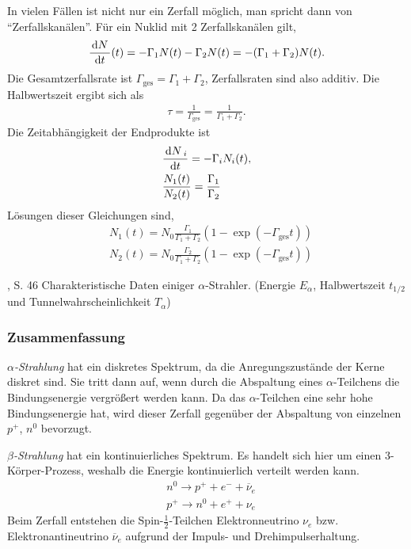 In vielen Fällen ist nicht nur ein Zerfall möglich, man spricht dann von
``Zerfallskanälen''. Für ein Nuklid mit 2 Zerfallskanälen gilt,
\begin{align*}
\frac{\,\mathrm{d} N\,}{\,\mathrm{d} t\,}(t) = -\Gamma_1 N(t) - \Gamma_2 N(t) = -(\Gamma_1+\Gamma_2)N(t).
\end{align*}
Die Gesamtzerfallsrate ist $\Gamma_\text{ges} = \Gamma_1+\Gamma_2$,
Zerfallsraten sind also additiv. Die Halbwertszeit ergibt sich als
\begin{align*}
\tau = \frac{1}{\Gamma_\text{ges}} = \frac{1}{\Gamma_1+\Gamma_2}.
\end{align*}
Die Zeitabhängigkeit der Endprodukte ist
\begin{align*}
&\frac{\,\mathrm{d} N\,_i}{\,\mathrm{d} t\,} = -\Gamma_i N_i(t),\\
&\frac{N_1(t)}{N_2(t)} = \frac{\Gamma_1}{\Gamma_2}
\end{align*}
Lösungen dieser Gleichungen sind,
\begin{align*}
&N_1(t) = N_0 \frac{\Gamma_1}{\Gamma_1+\Gamma_2}\left(1 -
\exp\left(-\Gamma_\text{ges} t \right)\right)\\
&N_2(t) = N_0 \frac{\Gamma_2}{\Gamma_1+\Gamma_2}\left(1 -
\exp\left(-\Gamma_\text{ges} t \right)\right)
\end{align*}

% 

	{\DemtroederFour, S. 46}
	{Charakteristische Daten einiger $\alpha$-Strahler. (Energie $E_\alpha$,
	Halbwertszeit $t_{1/2}$ und Tunnelwahrscheinlichkeit $T_\alpha$)}

\subsubsection{Zusammenfassung}

\textit{$\alpha$-Strahlung} hat ein diskretes Spektrum, da die Anregungszustände
der Kerne diskret sind. Sie tritt dann auf, wenn durch die Abspaltung eines
$\alpha$-Teilchens die Bindungsenergie vergrößert werden kann. Da das
$\alpha$-Teilchen eine sehr hohe Bindungsenergie hat, wird dieser Zerfall
gegenüber der Abspaltung von einzelnen $p^+$, $n^0$ bevorzugt.

\textit{$\beta$-Strahlung} hat ein kontinuierliches Spektrum. Es handelt sich
hier um einen 3-Körper-Prozess, weshalb die Energie kontinuierlich verteilt
werden kann.
\begin{align*}
&n^0 \to p^+ + e^- + \overline{\nu}_e\\
&p^+ \to n^0 + e^+ + \nu_e
\end{align*}
Beim Zerfall entstehen die Spin-$\frac{1}{2}$-Teilchen Elektronneutrino $\nu_e$
bzw. Elektronantineutrino $\overline{\nu}_e$ aufgrund der
Impuls- und Drehimpulserhaltung.

